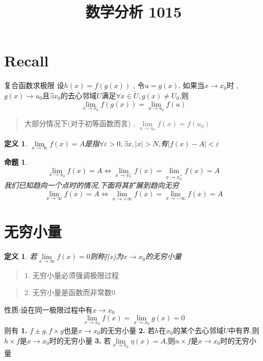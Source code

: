 \documentclass[UTF8,11pt]{ctexart}
\title{数学分析 1015}
\date{}
\theoremstyle{cnthm}
\newtheorem{prop}[thm]{命题}
\newtheorem{defn}[thm]{定义}
\begin{document}
\maketitle

\section{Recall}

复合函数求极限
设$h(x) = f(g(x))$ , 令$u = g(x)$. 如果当$x \to x_0$时 , $g(x) \to u_0$且$\exists x_0$的去心邻域$\mathring{U}$满足$\forall x \in \mathring{U} , g(x) \neq U_0$,则
\[
\lim_{x \to x_0} f(g(x)) = \lim_{u \to u_0}f(u)
\]
\begin{quote}
大部分情况下(对于初等函数而言) , $\lim\limits_{u \to u_0} f(x) = f(u_0)$
\end{quote}

\begin{defn}
$\lim\limits_{x \to \infty} f(x) = A$是指$\forall \varepsilon >0 , \exists x , |x| > N$,有$|f(x)-A|< \varepsilon$
\end{defn}

\begin{prop}
\[
\lim_{x \to x_0}f(x) = A \Leftrightarrow \lim_{x \to x_0^-}f(x) = \lim_{x \to x_0^+}f(x) = A
\]
我们已知趋向一个点时的情况,下面将其扩展到趋向无穷
\[
\lim_{x \to \infty}f(x) = A \Leftrightarrow \lim_{x \to +\infty}f(x) = \lim_{x \to -\infty}f(x) = A
\]
\end{prop}

\section{无穷小量}

\begin{defn}
若$\lim\limits_{x \to \infty} f(x) = 0$则称f(x)为$x \to x_0$的无穷小量
\end{defn}

\begin{quote}
1. 无穷小量必须强调极限过程
\end{quote}
\begin{quote}
2. 无穷小量是函数而非常数0
\end{quote}

性质:设在同一极限过程中有$x \to x_0$
\[
\lim_{x \to x_0} f(x) = \lim_{x \to x_0} g(x) = 0
\]
则有
\noindent\textbf{1.} $f \pm g , f \times g$也是$x \to x_0$的无穷小量
\noindent\textbf{2.} 若$h$在$x_0$的某个去心邻域$\mathring{U}$中有界,则$h \times f$是$x \to x_0$时的无穷小量
\noindent\textbf{3.} 若$\lim\limits_{x \to x_0} \eta(x) = A$,则$n \times f$是$x \to x_0$时的无穷小量
\end{document}

